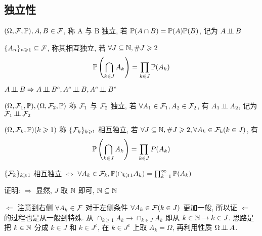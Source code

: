 \subsection{独立性}

\begin{definition}[事件间的独立性]
    $(\Omega,\mathcal{F}, \mathbb{P}), A,B\in \mathcal{F}$, 称 A 与 B 独立, 若 $\mathbb{P}(A\cap B)=\mathbb{P}(A)\mathbb{P}(B)$, 记为 $A\operatorname{\perp\!\!\!\perp} B$
\end{definition}

\begin{definition}[事件间的相互独立]
    $\{{A}_{n}\}_{n \geqslant 1} \subseteq  \mathcal{F}$, 称其相互独立, 若 $\forall J\subseteq  \mathbb{N}, \#J\geqslant 2$
    \[
    \mathbb{P}\left(\bigcap_{k\in J}A_k\right)=\prod_{k\in J}\mathbb{P}(A_k)
    \]
\end{definition}

\begin{property}\label{prop:counter_indep}
    $A\ind B\Rightarrow A\ind B^c, A^c \ind B, A^c\ind B^c$
\end{property}

\begin{definition}\label{def:sigma_indep}
    $(\Omega, \mathcal{F}_1, \mathbb{P}), (\Omega, \mathcal{F}_2, \mathbb{P})$ 称 $\mathcal{F}_1$ 与 $\mathcal{F}_2$ 独立, 若 $\forall A_1\in \mathcal{F}_1, A_2\in \mathcal{F}_2$, 有 $A_1\operatorname{\perp\!\!\!\perp} A_2$, 记为 $\mathcal{F}_1\operatorname{\perp\!\!\!\perp} \mathcal{F}_2$
\end{definition}

\begin{definition}
    $(\Omega, \mathcal{F}_k, \mathbb{P})(k\geqslant 1)$ 称 $\{{\mathcal{F}}_{k}\}_{k \geqslant 1}$ 相互独立, 若 $\forall J\subseteq  \mathbb{N}, \#J\geqslant 2, \forall A_k\in \mathcal{F}_k(k\in J)$, 有
    \[
    \mathbb{P}\left(\bigcap_{k\in J}A_k\right)=\prod_{k\in J}P(A_k)
    \]
\end{definition}

\begin{property}\label{prop:equiv_sigma_mutual_indep}
    $\{{\mathcal{F}}_{k}\}_{k \geqslant 1}$ 相互独立 $\Leftrightarrow$ $\forall A_k\in \mathcal{F}_k, \mathbb{P}(\cap_{k\geqslant 1}A_k)=\prod_{k=1}^{\infty}\mathbb{P}(A_k)$
\end{property}

证明: $\Rightarrow$ 显然, $J$ 取 $\mathbb{N}$ 即可, $\mathbb{N}\subseteq  \mathbb{N}$

$\Leftarrow$ 注意到右侧 $\forall A_k\in \mathcal{F}$ 对于左侧条件 $\forall A_k\in \mathcal{F}(k\in J)$ 更加一般, 所以证 $\Leftarrow$ 的过程也是从一般到特殊. 从 $\cap_{k\geq 1}A_k\rightarrow \cap_{k\in J}A_k$ 即从 $k\in\mathbb{N}\rightarrow k\in J$. 思路是把 $k\in\mathbb{N}$ 分成 $k\in J$ 和 $k\in J^c$, 在 $k\in J^c$ 上取 $A_k=\Omega$, 再利用性质 $\Omega\operatorname{\perp\!\!\!\perp} A$. 

